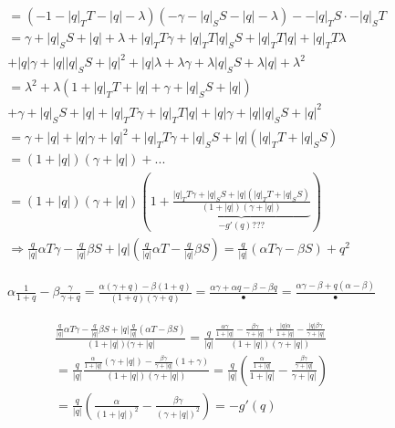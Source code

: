 \documentclass[11pt,a4paper]{article}
\begin{document}
	\begin{align*}
		&= (-1 -{|q|}_TT-|q| - \lambda)(-\gamma - {|q|}_S S- |q| - \lambda) - -{|q|}_T S \cdot -{|q|}_S T \\
		&= \gamma + {|q|}_S S + |q| + \lambda 
		+ {|q|}_T T \gamma + {|q|}_T T {|q|}_S S +{|q|}_T T |q| + {|q|}_T T \lambda\\
		&+ |q|\gamma + |q|{|q|}_S S + |q|^2 + |q|\lambda 
		+ \lambda\gamma + \lambda{|q|}_S S + \lambda|q| + \lambda^2 \\
		&= \lambda^2 + \lambda\left(
		1 + {|q|}_T T + |q| + \gamma + {|q|}_S S + |q| \right) \\
		& + \gamma + {|q|}_S S + |q| + {|q|}_T T \gamma + {|q|}_T T |q| + |q|\gamma + |q| {|q|}_S S + |q|^2 \\
		&= \gamma + |q| + |q|\gamma + |q|^2 + {|q|}_T T \gamma + {|q|}_S S + |q|({|q|}_T T + {|q|}_S S) \\
		&= (1 + |q|)(\gamma + |q|) + ... \\
		&= (1 + |q|)(\gamma + |q|)\left(1 + \underbrace{\frac{{|q|}_T T \gamma + {|q|}_S S + |q|({|q|}_T T + {|q|}_S S)}{(1 + |q|)(\gamma + |q|)}}_{-g'(q)???}\right) \\
		&\Rightarrow \frac{q}{|q|} \alpha T \gamma - \frac{q}{|q|} \beta S + |q|\left( \frac{q}{|q|}\alpha T - \frac{q}{|q|} \beta S \right) = \frac{q}{|q|}(\alpha T \gamma - \beta S) + q^2
	\end{align*}
	
	\begin{align*}
		\alpha \frac{1}{1+q} - \beta \frac{\gamma}{\gamma + q} = \frac{\alpha (\gamma + q) - \beta(1+q)}{(1+q)(\gamma+q)} = \frac{\alpha \gamma + \alpha q - \beta - \beta q}{•} = \frac{\alpha \gamma - \beta + q(\alpha - \beta)}{•}
	\end{align*}
	
	\begin{align*}
		\frac{\frac{q}{|q|}\alpha T \gamma - \frac{q}{|q|}\beta S + |q|\frac{q}{|q|}(\alpha T - \beta S)}
		{(1+|q|)(\gamma + |q|} = 
		\frac{q}{|q|}
		\frac{\frac{\alpha \gamma}{1 + |q|} - \frac{\beta \gamma}{\gamma + |q|} + 
		\frac{|q| \alpha}{1+|q|} - \frac{|q| \beta\gamma}{\gamma + |q|}}
		{(1+|q|)(\gamma + |q|)} \\
		= \frac{q}{|q|}
		\frac{\frac{\alpha}{1+|q|}(\gamma + |q|) - \frac{\beta \gamma}{\gamma + |q|}(1 + \gamma)}
		{(1+|q|)(\gamma + |q|)}
		= \frac{q}{|q|} \left(
			\frac{\frac{\alpha}{1+|q|}}{1+|q|} - \frac{\frac{\beta \gamma}{\gamma + |q|}}{\gamma+|q|}
		\right) \\
		= \frac{q}{|q|}
		\left(
			\frac{\alpha}{(1 + |q|)^2} - \frac{\beta \gamma}{(\gamma + |q|)^2}
		\right)
		= -g'(q)
	\end{align*}
	
\end{document}
